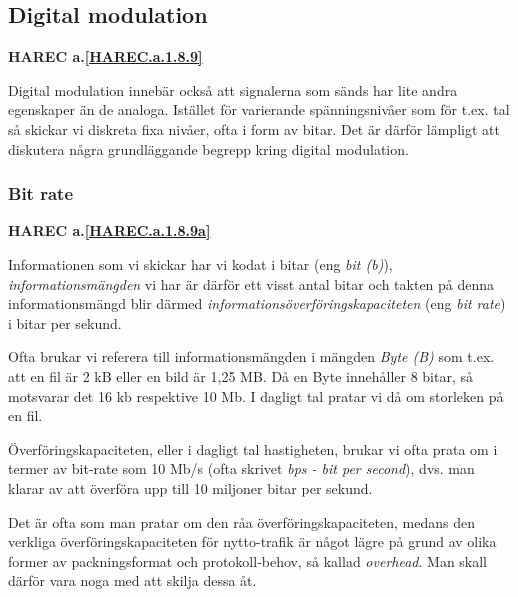 \subsection{Digital modulation}
\textbf{HAREC a.\ref{HAREC.a.1.8.9}\label{myHAREC.a.1.8.9}}
\begin{rev-nytt}[MAD]

Digital modulation innebär också att signalerna som sänds har lite andra
egenskaper än de analoga. Istället för varierande spänningsnivåer som för
t.ex. tal så skickar vi diskreta fixa nivåer, ofta i form av bitar. Det är
därför lämpligt att diskutera några grundläggande begrepp kring digital
modulation.

\end{rev-nytt}

\subsubsection{Bit rate}
\textbf{HAREC a.\ref{HAREC.a.1.8.9a}\label{myHAREC.a.1.8.9a}}
\begin{rev-nytt}[MAD]

Informationen som vi skickar har vi kodat i bitar (eng \emph{bit (b)}),
\emph{informationsmängden} vi har är därför ett visst antal bitar och takten på
denna informationsmängd blir därmed \emph{informationsöverföringskapaciteten}
(eng \emph{bit rate}) i bitar per sekund.

Ofta brukar vi referera till informationsmängden i mängden \emph{Byte (B)}
som t.ex. att en fil är 2 kB eller en bild är 1,25 MB. Då en Byte innehåller
8 bitar, så motsvarar det 16 kb respektive 10 Mb. I dagligt tal pratar vi då om
storleken på en fil.

Överföringskapaciteten, eller i dagligt tal hastigheten, brukar vi ofta prata
om i termer av bit-rate som 10 Mb/s (ofta skrivet \emph{bps - bit per second}),
dvs. man klarar av att överföra upp till 10 miljoner bitar per sekund.

Det är ofta som man pratar om den råa överföringskapaciteten, medans den
verkliga överföringskapaciteten för nytto-trafik är något lägre på grund av
olika former av packningsformat och protokoll-behov, så kallad \emph{overhead}.
Man skall därför vara noga med att skilja dessa åt.

\end{rev-nytt}

